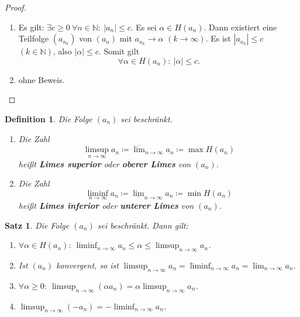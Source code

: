 \documentclass[12pt]{extreport} %
\newcommand{\N}{\mathbb{N}}
\theoremstyle{named}
\theoremstyle{itshape}
\newtheorem{satz}[unnamedtheorem]{Satz}
\newtheorem*{definition}{Definition}
\theoremstyle{normal}
\begin{document}
\begin{proof}\
	\begin{enumerate}
		\item Es gilt: $\exists c \geq 0 ~ \forall n \in \N: ~ |a_{n}| \leq c$. Es sei $\alpha \in H(a_{n})$. Dann existiert eine Teilfolge $(a_{n_{k}})$ von $(a_n)$
		        mit $a_{n_{k}} \rightarrow \alpha$ $(k \rightarrow \infty)$. Es ist $|a_{n_{k}}| \leq c$ $(k \in \N)$, also $|\alpha| \leq c$. Somit gilt
		        $$
		        \forall \alpha \in H(a_{n}): ~ |\alpha| \leq c.
		        $$
		\item ohne Beweis.
	\end{enumerate}
\end{proof}


   
\begin{definition} 
	Die Folge $(a_{n})$ sei beschränkt. 
	\begin{enumerate}
		\item Die Zahl
		$$
		\limsup_{n \rightarrow \infty} a_{n} \coloneqq \overline{\lim}_{n \rightarrow \infty} a_{n} \coloneqq \max H(a_{n})
		$$
	        hei{\ss}t \textbf{Limes superior} oder \textbf{oberer Limes} von $(a_{n})$.
		\item Die Zahl 
		$$
		\liminf_{n \rightarrow \infty} a_{n} \coloneqq \underline{\lim}_{n \rightarrow \infty} a_{n} \coloneqq \min H(a_{n})
		$$
		hei{\ss}t \textbf{Limes inferior} oder \textbf{unterer Limes} von $(a_{n})$.
	\end{enumerate}
\end{definition}


\begin{satz} \label{2.14:satz}
	Die Folge $(a_{n})$ sei beschränkt. Dann gilt:
	\begin{enumerate}
		\item $\forall \alpha \in H(a_{n}): ~ \liminf_{n \rightarrow \infty} a_{n} \leq \alpha \leq \limsup_{n \rightarrow \infty} a_{n}$.
		\item Ist $(a_{n})$ konvergent, so ist $\limsup_{n \rightarrow \infty} a_{n} = \liminf_{n \rightarrow \infty} a_{n} = \lim_{n \rightarrow \infty} a_{n}$.
		\item $\forall \alpha \geq 0: ~ \limsup_{n \rightarrow \infty}(\alpha a_{n}) = \alpha \limsup_{n \rightarrow \infty} a_{n}$.
		\item $\limsup_{n \rightarrow \infty} (-a_{n}) = - \liminf_{n \rightarrow \infty} a_{n}$.
	\end{enumerate}
\end{satz}
\end{document}
